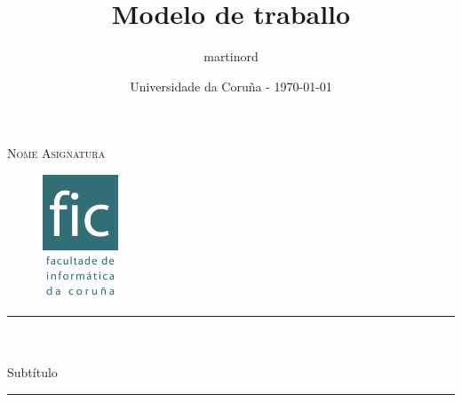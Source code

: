 \documentclass[12pt]{article}
\begin{document}
\makeatletter	%


\title{Modelo de traballo}

\def \subtitle {Subtítulo}

\def \modulename {Nome Asignatura}

\author{martinord}

\date{Universidade da Coruña - \today}


\begin{titlepage}

\newcommand{\HRule}{\rule{\linewidth}{0.5mm}} %

\center %
 
 
\textsc{\Large \modulename}\\[1cm]

\begin{figure}[!h]
	\centering
	\includegraphics[width=0.2\textwidth]{logo.png}
\end{figure}

\HRule \\[0.5cm]
{ \huge \bfseries \@title}\\[0.3cm]
{ \Large \subtitle}\\[0.4cm]
\HRule \\[1.5cm]
 
\@author \\[5cm]	%

{\large \@date}\\ 
 

\vfill %

\end{titlepage}

\tableofcontents
\clearpage



\clearpage


 
\end{document}
